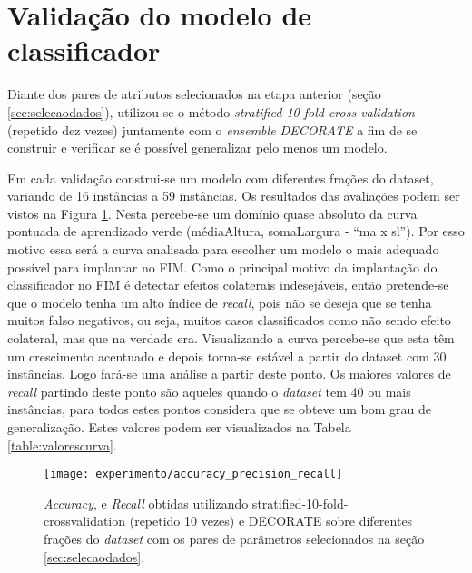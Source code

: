 \section{Validação do modelo de classificador}
\label{sec:constvalidacao}
Diante dos pares de atributos selecionados na etapa anterior (seção \ref{sec:selecaodados}), utilizou-se o método \textit{stratified-10-fold-cross-validation} (repetido dez vezes) juntamente com o \textit{ensemble DECORATE} a fim de se construir e verificar se é possível generalizar pelo menos um modelo. 

Em cada validação construi-se um modelo com diferentes frações do dataset, variando de 16 instâncias a 59 instâncias. Os resultados das avaliações podem ser vistos na Figura \ref{fig:accuracy_precision_recall}. Nesta percebe-se um domínio quase absoluto da curva pontuada de aprendizado verde (médiaAltura, somaLargura - ``ma x sl''). Por esso motivo essa será a curva analisada para escolher um modelo o mais adequado possível para implantar no FIM. Como o principal motivo da implantação do classificador no FIM é detectar efeitos colaterais indesejáveis, então pretende-se que o modelo tenha um alto índice de \textit{recall}, pois não se deseja que se tenha muitos falso negativos, ou seja, muitos casos classificados como não sendo efeito colateral, mas que na verdade era. Visualizando a curva percebe-se que esta têm um crescimento acentuado e depois torna-se estável a partir do dataset com 30 instâncias. Logo fará-se uma análise a partir deste ponto. Os maiores valores de \textit{recall} partindo deste ponto são aqueles quando o \textit{dataset} tem 40 ou mais instâncias, para todos estes pontos considera que se obteve um bom grau de generalização. Estes valores podem ser visualizados na Tabela \ref{table:valorescurva}. 

\begin{figure}[!htb] \centering 
  \centering
  \texttt{[image: experimento/accuracy\_precision\_recall]} 
  \caption{\textit{Accuracy},  e \textit{Recall} obtidas utilizando stratified-10-fold-crossvalidation (repetido 10 vezes) e DECORATE sobre diferentes frações do \textit{dataset} com os pares de parâmetros  selecionados na seção \ref{sec:selecaodados}.} 
  \label{fig:accuracy_precision_recall}
\end{figure}

